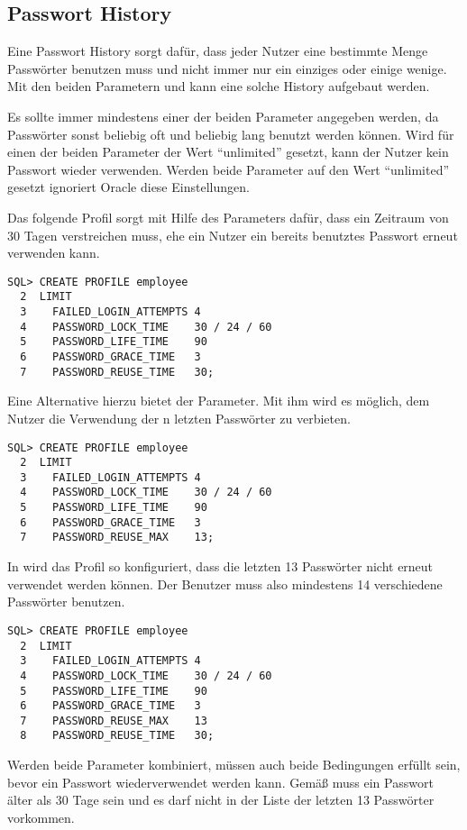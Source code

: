       \subsection{Passwort History}
        Eine Passwort History sorgt daf\"ur, dass jeder Nutzer eine bestimmte
        Menge Passw\"orter benutzen muss und nicht immer nur ein einziges oder
        einige wenige. Mit den beiden Parametern
         und
         kann eine solche History aufgebaut
        werden.
        \begin{merke}
          Es sollte immer mindestens einer der beiden Parameter angegeben
          werden, da Passw\"orter sonst beliebig oft und beliebig lang benutzt
          werden k\"onnen. Wird f\"ur einen der beiden Parameter der Wert
          \enquote{unlimited} gesetzt, kann der Nutzer kein Passwort wieder
          verwenden. Werden beide Parameter auf den Wert \enquote{unlimited}
          gesetzt ignoriert Oracle diese Einstellungen.
        \end{merke}
        Das folgende Profil sorgt mit Hilfe des Parameters  daf\"ur, dass ein Zeitraum von 30 Tagen verstreichen muss, ehe ein Nutzer ein bereits benutztes Passwort erneut verwenden kann.
        \begin{lstlisting}[caption={Wiederverwendung eines
        Passworts},label=admin221,language=oracle_sql]
SQL> CREATE PROFILE employee
  2  LIMIT
  3    FAILED_LOGIN_ATTEMPTS 4
  4    PASSWORD_LOCK_TIME    30 / 24 / 60
  5    PASSWORD_LIFE_TIME    90
  6    PASSWORD_GRACE_TIME   3
  7    PASSWORD_REUSE_TIME   30;
        \end{lstlisting}
        Eine Alternative hierzu bietet der  Parameter. Mit ihm wird es m\"oglich, dem Nutzer die Verwendung der n letzten Passw\"orter zu verbieten.
        \begin{lstlisting}[caption={Wiederverwendung eines
        Passworts},label=admin222,language=oracle_sql]
SQL> CREATE PROFILE employee
  2  LIMIT
  3    FAILED_LOGIN_ATTEMPTS 4
  4    PASSWORD_LOCK_TIME    30 / 24 / 60
  5    PASSWORD_LIFE_TIME    90
  6    PASSWORD_GRACE_TIME   3
  7    PASSWORD_REUSE_MAX    13;
        \end{lstlisting}
        In  wird das Profil so konfiguriert, dass die letzten 13 Passw\"orter nicht erneut verwendet werden k\"onnen. Der Benutzer muss also mindestens 14 verschiedene Passw\"orter benutzen.
        \begin{lstlisting}[caption={Wiederverwendung eines
        Passworts},label=admin223,language=oracle_sql]
SQL> CREATE PROFILE employee
  2  LIMIT
  3    FAILED_LOGIN_ATTEMPTS 4
  4    PASSWORD_LOCK_TIME    30 / 24 / 60
  5    PASSWORD_LIFE_TIME    90
  6    PASSWORD_GRACE_TIME   3
  7    PASSWORD_REUSE_MAX    13
  8    PASSWORD_REUSE_TIME   30;
        \end{lstlisting}
        Werden beide Parameter kombiniert, m\"ussen auch beide Bedingungen erf\"ullt sein, bevor ein Passwort wiederverwendet werden kann. Gem\"a\ss{}  muss ein Passwort \"alter als 30 Tage sein und es darf nicht in der Liste der letzten 13 Passw\"orter vorkommen.
